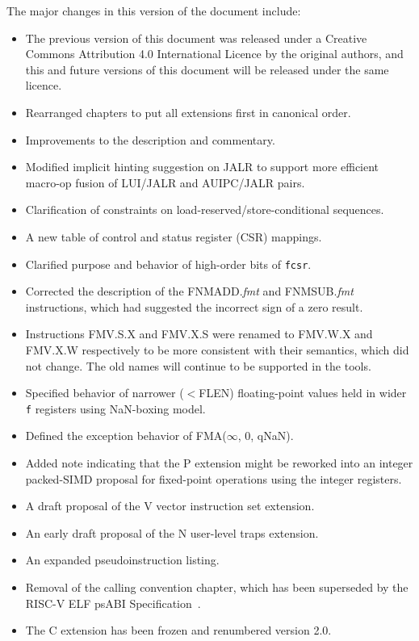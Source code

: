 The major changes in this version of the document include:
\begin{itemize}
\parskip 0pt
\itemsep 1pt
\item The previous version of this document was released under a
  Creative Commons Attribution 4.0 International Licence by the
  original authors, and this and future versions of this document will
  be released under the same licence.
\item Rearranged chapters to put all extensions first in canonical order.
\item Improvements to the description and commentary.
\item Modified implicit hinting suggestion on JALR to support more efficient
  macro-op fusion of LUI/JALR and AUIPC/JALR pairs.
\item Clarification of constraints on load-reserved/store-conditional sequences.
\item A new table of control and status register (CSR) mappings.
\item Clarified purpose and behavior of high-order bits of {\tt fcsr}.
\item Corrected the description of the FNMADD.{\em fmt} and FNMSUB.{\em fmt}
      instructions, which had suggested the incorrect sign of a zero result.
\item Instructions FMV.S.X and FMV.X.S were renamed to FMV.W.X and
  FMV.X.W respectively to be more consistent with their
  semantics, which did not change.
  The old names will continue to be supported in the tools.
\item Specified behavior of narrower ($<$FLEN) floating-point values held in
  wider {\tt f} registers using NaN-boxing model.
\item Defined the exception behavior of FMA($\infty$, 0, qNaN).
\item Added note indicating that the P extension might be reworked
  into an integer packed-SIMD proposal for fixed-point operations
  using the integer registers.
\item A draft proposal of the V vector instruction set extension.
\item An early draft proposal of the N user-level traps extension.
\item An expanded pseudoinstruction listing.
\item Removal of the calling convention chapter, which has been superseded by
      the RISC-V ELF psABI Specification~\cite{riscv-elf-psabi}.
\item The C extension has been frozen and renumbered version 2.0.
\end{itemize}

